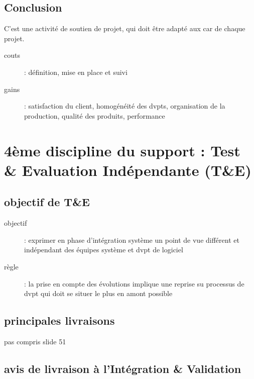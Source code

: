 	\subsection{Conclusion}

C’est une activité de soutien de projet, qui doit être adapté aux car de chaque projet.\\
	\begin{description}
	\item[couts] : définition, mise en place et suivi
	\item[gains] : satisfaction du client, homogénéité des dvpts, organisation de la production, qualité des produits, performance
	\end{description}

\section{4ème discipline du support : Test \& Evaluation Indépendante (T\&E)}

	\subsection{objectif de T\&E}
	\begin{description}	
	\item[objectif] : exprimer en phase d’intégration système un point de vue différent et indépendant des équipes système et dvpt de logiciel
	\item[règle] : la prise en compte des évolutions implique une reprise su processus de dvpt qui doit se situer le plus en amont possible
	\end{description}

	\subsection{principales livraisons}
pas compris slide 51

	\subsection{avis de livraison à l’Intégration \& Validation}

